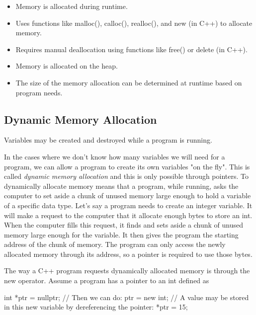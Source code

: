\documentclass{report}
\begin{document}
    \begin{itemize}
        \item Memory is allocated during runtime.
        \item Uses functions like malloc(), calloc(), realloc(), and new (in C++) to allocate memory.
        \item Requires manual deallocation using functions like free() or delete (in C++).
        \item Memory is allocated on the heap.
        \item The size of the memory allocation can be determined at runtime based on program needs.
    \end{itemize}



    \bigbreak \noindent 
    \subsection{Dynamic Memory Allocation}
    \bigbreak \noindent 
    \begin{concept}
 Variables may be created and destroyed while a program is running.
	\end{concept}
    \bigbreak \noindent 
    In the cases where we don't know how many variables we will need for a program, we can allow a program to create its own variables "on the fly". This is called \textit{dynamic memory allocation} and this is only possible through pointers.
    \bigbreak \noindent 
    To dynamically allocate memory means that a program, while running, asks the computer
to set aside a chunk of unused memory large enough to hold a variable of a specific data
type. Let’s say a program needs to create an integer variable. It will make a request to the
computer that it allocate enough bytes to store an int. When the computer fills this request,
it finds and sets aside a chunk of unused memory large enough for the variable. It then gives
the program the starting address of the chunk of memory. The program can only access the
newly allocated memory through its address, so a pointer is required to use those bytes.

    \bigbreak \noindent 
    The way a C++ program requests dynamically allocated memory is through the new operator. Assume a program has a pointer to an int defined as
    \bigbreak \noindent 
    
    \begin{cppcode}
int *ptr = nullptr;
// Then we can do:
ptr = new int;
// A value may be stored in this new variable by dereferencing the pointer:
*ptr = 15;
    \end{cppcode}
    
\end{document}
